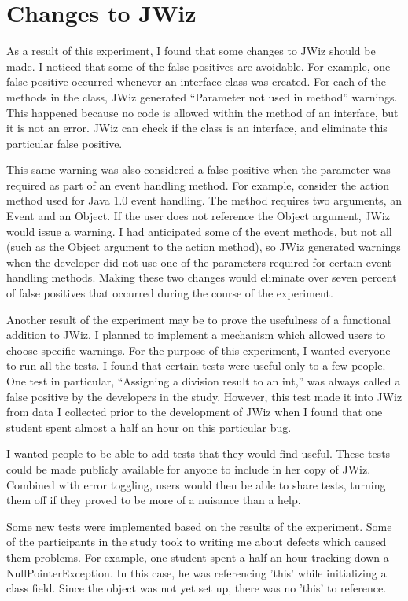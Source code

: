 \section{Changes to JWiz}
As a result of this experiment, I found that some changes to JWiz should be
made.  I noticed that some of the false positives are avoidable.  For
example, one false positive occurred whenever an interface class was
created.  For each of the methods in the class, JWiz generated ``Parameter
not used in method'' warnings.  This happened because no code is allowed
within the method of an interface, but it is not an error. JWiz can check
if the class is an interface, and eliminate this particular false positive.

This same warning was also considered a false positive when the parameter
was required as part of an event handling method.  For example, consider
the action method used for Java 1.0 event handling.  The method requires
two arguments, an Event and an Object.  If the user does not reference the
Object argument, JWiz would issue a warning.  I had anticipated some of the
event methods, but not all (such as the Object argument to the action
method), so JWiz generated warnings when the developer did not use one of
the parameters required for certain event handling methods.  Making these
two changes would eliminate over seven percent of false positives that
occurred during the course of the experiment.

Another result of the experiment may be to prove the usefulness of a
functional addition to JWiz. I planned to implement a mechanism which
allowed users to choose specific warnings.  For the purpose of this
experiment, I wanted everyone to run all the tests.  I found that certain
tests were useful only to a few people.  One test in particular,
``Assigning a division result to an int,'' was always called a false
positive by the developers in the study.  However, this test made it into
JWiz from data I collected prior to the development of JWiz when I found
that one student spent almost a half an hour on this particular bug.

I wanted people to be able to add tests that they would find useful.  These
tests could be made publicly available for anyone to include in her copy of
JWiz.  Combined with error toggling, users would then be able to share
tests, turning them off if they proved to be more of a nuisance than a help.

Some new tests were implemented based on the results of the experiment.
Some of the participants in the study took to writing me about defects
which caused them problems.  For example, one student spent a half an hour
tracking down a NullPointerException.  In this case, he was referencing
'this' while initializing a class field.  Since the object was not yet set
up, there was no 'this' to reference.

